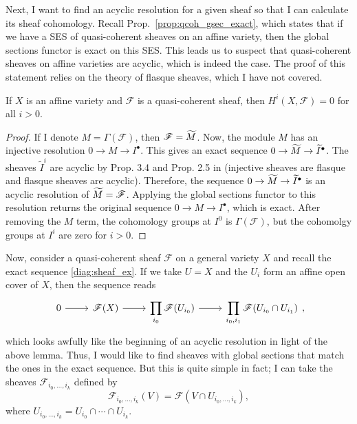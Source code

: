 Next, I want to find an acyclic resolution for a given sheaf so that I can
calculate its sheaf cohomology. Recall Prop.~\ref{prop:qcoh_gsec_exact},
which states that if we have a SES of quasi-coherent sheaves on an affine
variety, then the global sections functor is exact on this SES. This leads us
to suspect that quasi-coherent sheaves on affine varieties are acyclic,
which is indeed the case. The proof of this statement relies on the theory
of flasque sheaves, which I have not covered.
\begin{lemm}\label{lemm:affine_cohom_vanishes}
  If $X$ is an affine variety and $\mathscr{F}$ is a quasi-coherent
  sheaf, then $H^{i}(X, \mathscr{F})=0$ for all $i>0$.
\end{lemm}
\begin{proof}
  If I denote $M=\Gamma(\mathscr{F})$, then $\mathscr{F}=\widetilde{M}$. Now, the
  module $M$ has an injective resolution $0\to M\to I^{\bullet}$.
  This gives an exact sequence $0\to \widetilde{M}\to\widetilde{I}^{\bullet}$.
  The sheaves $\widetilde{I}^{i}$ are acyclic by Prop. 3.4 and Prop. 2.5
  in \cite{hartshorne} (injective sheaves are flasque and flasque sheaves
  are acyclic). Therefore, the sequence $0\to \widetilde{M}\to\widetilde{I}^{\bullet}$
  is an acyclic resolution of $\widetilde{M}=\mathscr{F}$. Applying the global sections
  functor to this resolution returns the original sequence
  $0\to M\to I^{\bullet}$, which is exact. After removing the $M$ term, the
  cohomology groups at $I^{0}$ is $\Gamma(\mathscr{F})$, but the cohomolgy
  groups at $I^{i}$ are zero for $i>0$.
\end{proof}
Now, consider a quasi-coherent sheaf $\mathscr{F}$ on a general variety $X$
and recall the exact sequence \eqref{diag:sheaf_ex}. If we take $U=X$
and the $U_{i}$ form an affine open cover of $X$, then the sequence reads
\[\begin{tikzcd}
    0\rar & \mathscr{F}(X)\rar
    & \displaystyle\prod_{i_{0}}\mathscr{F}(U_{i_{0}})\rar
    & \displaystyle\prod_{i_{0},i_{1}}\mathscr{F}(U_{i_{0}}\cap U_{i_{1}})
  \end{tikzcd},\]
which looks awfully like the beginning of an acyclic resolution in light of
the above lemma. Thus, I would like to find sheaves with global sections
that match the ones in the exact sequence. But this is quite simple in fact;
I can take the sheaves
$\mathscr{F}_{i_{0},\ldots,i_{k}}$ defined by
\[
  \mathscr{F}_{i_{0},\ldots,i_{k}}(V)=\mathscr{F}(V\cap
  U_{i_{0},\ldots,i_{k}}),
\]
where $U_{i_{0},\ldots, i_{k}}=U_{i_{0}}\cap\cdots\cap U_{i_{k}}$.
